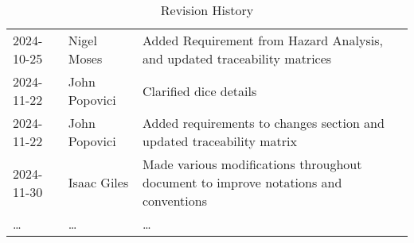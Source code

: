 \begin{table}[H]
\begin{tabularx}{\textwidth}{llX}
2024-10-25 & Nigel Moses & Added Requirement from Hazard Analysis, and updated traceability matrices\\
2024-11-22 & John Popovici & Clarified dice details\\
2024-11-22 & John Popovici & Added requirements to changes section and updated traceability matrix\\
2024-11-30 & Isaac Giles & Made various modifications throughout document to improve notations and conventions\\
\dots & \dots & \dots\\
\bottomrule
\end{tabularx}
\caption{Revision History} \label{TblRevisionHistory}
\end{table}

